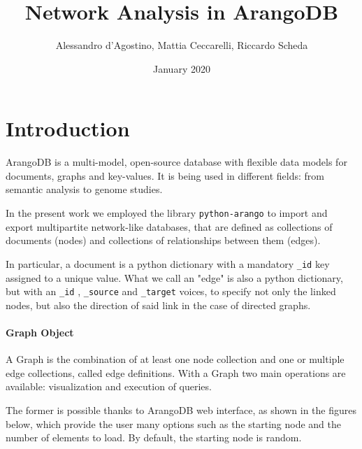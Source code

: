 \documentclass[11pt,twocolumn]{article}
\title{Network Analysis in ArangoDB}
\date{January 2020}
\author{Alessandro d'Agostino, Mattia Ceccarelli, Riccardo Scheda}
\begin{document}

\section{Introduction}
ArangoDB \cite{WEBSITE:arangodb} is a multi-model, open-source database with flexible data models for documents, graphs and key-values. It is being used in different fields: from semantic analysis to genome studies.

In the present work we employed the library \texttt{python-arango}  \cite{WEBSITE:pythonarango} to import and export multipartite network-like databases, that are defined as collections of documents (nodes) and collections of relationships between them (edges).

In particular, a document is a python dictionary with a mandatory  \texttt{\_id}  key assigned to a unique value.
What we call an "edge" is also a python dictionary, but with an  \texttt{\_id} ,  \texttt{\_source} and  \texttt{\_target}  voices, to specify not only the linked nodes, but also the direction of said link in the case of directed graphs.

\paragraph{Graph Object}
A Graph is the combination of at least one node collection and one or multiple edge collections, called edge definitions.
With a Graph two main operations are available: visualization and execution of queries.

The former is possible thanks to ArangoDB web interface, as shown in the figures below, which provide the user many options such as the starting node and the number of elements to load. By default, the starting node is random.
\end{document}
